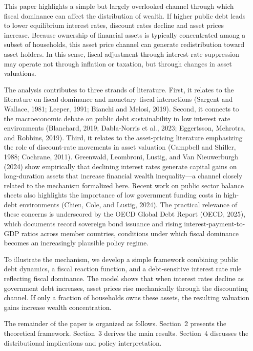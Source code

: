 \documentclass[3p]{elsarticle}
\begin{document}
This paper highlights a simple but largely overlooked channel through which fiscal
dominance can affect the distribution of wealth. If higher public debt leads to lower
equilibrium interest rates, discount rates decline and asset prices increase. Because
ownership of financial assets is typically concentrated among a subset of households,
this asset price channel can generate redistribution toward asset holders. In this
sense, fiscal adjustment through interest rate suppression may operate not through
inflation or taxation, but through changes in asset valuations.

The analysis contributes to three strands of literature. First, it relates to the literature
on fiscal dominance and monetary--fiscal interactions (Sargent and Wallace, 1981; Leeper,
1991; Bianchi and Melosi, 2019). Second, it connects to the macroeconomic debate on public
debt sustainability in low interest rate environments (Blanchard, 2019; Dabla-Norris et al.,
2023; Eggertsson, Mehrotra, and Robbins, 2019). Third, it relates to the asset-pricing
literature emphasizing the role of discount-rate movements in asset valuation (Campbell and
Shiller, 1988; Cochrane, 2011). Greenwald, Leombroni, Lustig, and Van Nieuwerburgh (2024)
show empirically that declining interest rates generate capital gains on long-duration assets
that increase financial wealth inequality---a channel closely related to the mechanism
formalized here. Recent work on public sector balance sheets also highlights
the importance of low government funding costs in high-debt environments (Chien, Cole, and
Lustig, 2024). The practical relevance of these concerns is underscored by the OECD Global
Debt Report (OECD, 2025), which documents record sovereign bond issuance and rising
interest-payment-to-GDP ratios across member countries, conditions under which fiscal
dominance becomes an increasingly plausible policy regime.

To illustrate the mechanism, we develop a simple framework combining public debt dynamics,
a fiscal reaction function, and a debt-sensitive interest rate rule reflecting fiscal
dominance. The model shows that when interest rates decline as government debt increases,
asset prices rise mechanically through the discounting channel. If only a fraction of
households owns these assets, the resulting valuation gains increase wealth concentration.

The remainder of the paper is organized as follows. Section~2 presents the theoretical
framework. Section~3 derives the main results. Section~4 discusses the distributional
implications and policy interpretation.
\end{document}
